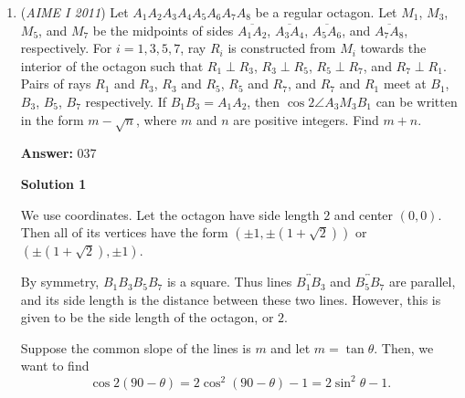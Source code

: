 \begin{enumerate}
 


 


	\item (\textit{AIME I 2011}) Let $A_1 A_2 A_3 A_4 A_5 A_6 A_7 A_8$ be a regular octagon.  Let $M_1$, $M_3$, $M_5$, and $M_7$ be the midpoints of sides $\overline{A_1 A_2}$, $\overline{A_3 A_4}$, $\overline{A_5 A_6}$, and $\overline{A_7 A_8}$, respectively.  For $i = 1, 3, 5, 7$, ray $R_i$ is constructed from $M_i$ towards the interior of the octagon such that $R_1 \perp R_3$, $R_3 \perp R_5$, $R_5 \perp R_7$, and $R_7 \perp R_1$.  Pairs of rays $R_1$ and $R_3$, $R_3$ and $R_5$, $R_5$ and $R_7$, and $R_7$ and $R_1$ meet at $B_1$, $B_3$, $B_5$, $B_7$ respectively.  If $B_1 B_3 = A_1 A_2$, then $\cos 2 \angle A_3 M_3 B_1$ can be written in the form $m - \sqrt{n}$, where $m$ and $n$ are positive integers.  Find $m + n$.


 
 \textbf{Answer: }037



\textbf{Solution 1}

We use coordinates. Let the octagon have side length $2$ and center $(0, 0)$. Then all of its vertices have the form $(\pm 1, \pm\left(1+\sqrt{2}\right))$ or $(\pm\left(1+\sqrt{2}\right), \pm 1)$.

 By symmetry, $B_{1}B_{3}B_{5}B_{7}$ is a square. Thus lines $\overleftrightarrow{B_{1}B_{3}}$ and $\overleftrightarrow{B_{5}B_{7}}$ are parallel, and its side length is the distance between these two lines. However, this is given to be the side length of the octagon, or $2$.

 Suppose the common slope of the lines is $m$ and let $m=\tan\theta$. Then, we want to find 
 \[\cos 2\left(90-\theta\right)=2\cos^{2}\left(90-\theta\right)-1=2\sin^{2}\theta-1.\]


\end{enumerate}
